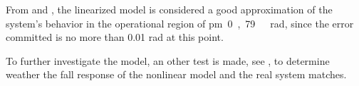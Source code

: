 \begin{minipage}{\linewidth}
\begin{minipage}{0.45\linewidth}
\begin{figure}[H]
			\centering
			\vspace{-.1cm}
			\captionsetup{justification=centering}
			\label{LinearizedVSNonlinearZoom}
		\end{figure}\vspace{-5mm}
	\end{minipage}
\end{minipage}

From  and , the linearized model is considered a good approximation of the system's behavior in the operational region of \si{\pm 0,79\ rad}, since the error committed is no more than 0.01 rad at this point.

To further investigate the model, an other test is made, see , to determine weather the fall response of the nonlinear model and the real system matches.

